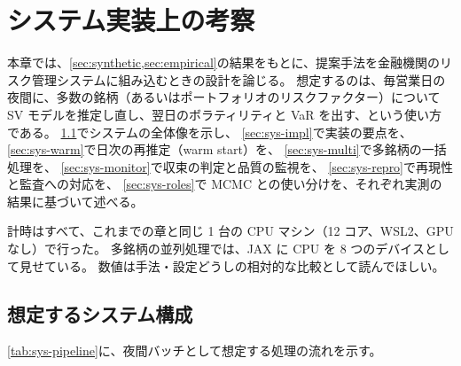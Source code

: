\section{システム実装上の考察}\label{sec:system}

本章では、\cref{sec:synthetic,sec:empirical}の結果をもとに、提案手法を金融機関のリスク管理システムに組み込むときの設計を論じる。
想定するのは、毎営業日の夜間に、多数の銘柄（あるいはポートフォリオのリスクファクター）について SV モデルを推定し直し、翌日のボラティリティと VaR を出す、という使い方である。
\cref{sec:sys-architecture}でシステムの全体像を示し、
\cref{sec:sys-impl}で実装の要点を、
\cref{sec:sys-warm}で日次の再推定（warm start）を、
\cref{sec:sys-multi}で多銘柄の一括処理を、
\cref{sec:sys-monitor}で収束の判定と品質の監視を、
\cref{sec:sys-repro}で再現性と監査への対応を、
\cref{sec:sys-roles}で MCMC との使い分けを、それぞれ実測の結果に基づいて述べる。

計時はすべて、これまでの章と同じ 1 台の CPU マシン（12 コア、WSL2、GPU なし）で行った。
多銘柄の並列処理では、JAX に CPU を 8 つのデバイスとして見せている。
数値は手法・設定どうしの相対的な比較として読んでほしい。

\subsection{想定するシステム構成}\label{sec:sys-architecture}

\cref{tab:sys-pipeline}に、夜間バッチとして想定する処理の流れを示す。

